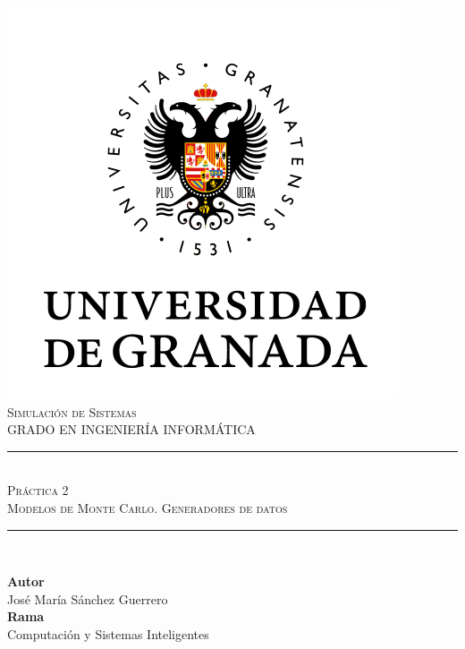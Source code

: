 \documentclass[11pt,a4paper]{report}
\newcommand{\asignatura}{Simulación de Sistemas}
\newcommand{\autor}{José María Sánchez Guerrero}
\newcommand{\titulo}{Práctica 2}
\newcommand{\subtitulo}{Modelos de Monte Carlo. Generadores de datos}
\begin{document}

\begin{titlepage}

\begin{minipage}{\textwidth}

\centering

\includegraphics[scale=0.5]{img/ugr.png}\\

\textsc{\Large \asignatura{}\\[0.2cm]}
\textsc{GRADO EN INGENIERÍA INFORMÁTICA}\\[1cm]

\noindent\rule[-1ex]{\textwidth}{1pt}\\[1.5ex]
\textsc{{\Huge \titulo\\[0.5ex]}}
\textsc{{\Large \subtitulo\\}}
\noindent\rule[-1ex]{\textwidth}{2pt}\\[3.5ex]

\end{minipage}

\vspace{0.5cm}

\begin{minipage}{\textwidth}

\centering

\textbf{Autor}\\ {\autor{}}\\[2.5ex]
\textbf{Rama}\\ {Computación y Sistemas Inteligentes}\\[2.5ex]
\vspace{0.3cm}


\end{minipage}
\end{titlepage}
\end{document}
